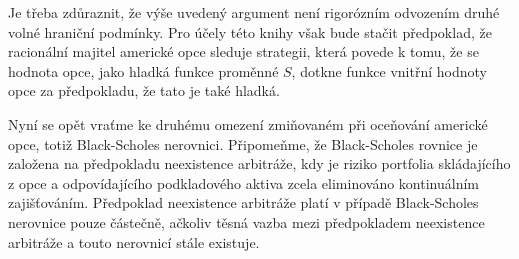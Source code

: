 \documentclass[a4paper]{book}
\begin{document}
Je třeba zdůraznit, že výše uvedený argument není rigorózním odvozením druhé volné hraniční podmínky. Pro účely této knihy však bude stačit předpoklad, že racionální majitel americké opce sleduje strategii, která povede k tomu, že se hodnota opce, jako hladká funkce proměnné $S$, dotkne funkce vnitřní hodnoty opce za předpokladu, že tato je také hladká.

Nyní se opět vraťme ke druhému omezení zmiňovaném při oceňování americké opce, totiž Black-Scholes nerovnici. Připomeňme, že Black-Scholes rovnice je založena na předpokladu neexistence arbitráže, kdy je riziko portfolia skládajícího z opce a odpovídajícího podkladového aktiva zcela eliminováno kontinuálním zajišťováním. Předpoklad neexistence arbitráže platí v případě Black-Scholes nerovnice pouze částečně, ačkoliv těsná vazba mezi předpokladem neexistence arbitráže a touto nerovnicí stále existuje.
\end{document}
